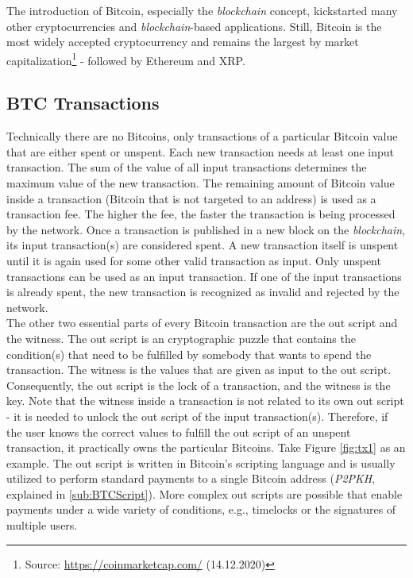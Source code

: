 \documentclass{cacthesis}
\begin{document}
        The introduction of Bitcoin, especially the \textit{blockchain} concept, kickstarted many other cryptocurrencies and \textit{blockchain}-based applications. Still, Bitcoin is the most widely accepted cryptocurrency and remains the largest by market capitalization\footnote{Source: \url{https://coinmarketcap.com/} (14.12.2020)} - followed by Ethereum and XRP.

        \subsection{BTC Transactions}
        \label{sub:BTCTx}
        
        Technically there are no Bitcoins, only transactions of a particular Bitcoin value that are either spent or unspent. Each new transaction needs at least one input transaction. The sum of the value of all input transactions determines the maximum value of the new transaction. The remaining amount of Bitcoin value inside a transaction (Bitcoin that is not targeted to an address) is used as a transaction fee. The higher the fee, the faster the transaction is being processed by the network. Once a transaction is published in a new block on the \textit{blockchain}, its input transaction(s) are considered spent. A new transaction itself is unspent until it is again used for some other valid transaction as input. Only unspent transactions can be used as an input transaction. If one of the input transactions is already spent, the new transaction is recognized as invalid and rejected by the network. \\
        The other two essential parts of every Bitcoin transaction are the out script and the witness. The out script is an cryptographic puzzle that contains the condition(s) that need to be fulfilled by somebody that wants to spend the transaction. The witness is the values that are given as input to the out script. Consequently, the out script is the lock of a transaction, and the witness is the key. Note that the witness inside a transaction is not related to its own out script - it is needed to unlock the out script of the input transaction(s). Therefore, if the user knows the correct values to fulfill the out script of an unspent transaction, it practically owns the particular Bitcoins. Take Figure \ref{fig:tx1} as an example. The out script is written in Bitcoin's scripting language and is usually utilized to perform standard payments to a single Bitcoin address (\textit{P2PKH}, explained in \ref{sub:BTCScript}). More complex out scripts are possible that enable payments under a wide variety of conditions, e.g., timelocks or the signatures of multiple users.
\end{document}
